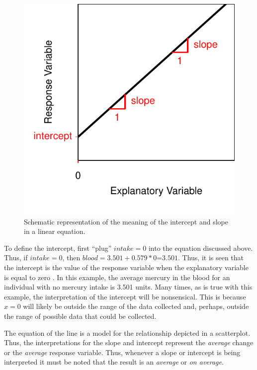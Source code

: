 \documentclass[10pt,openany]{book}\usepackage[]{graphicx}\usepackage[]{color}
\newenvironment{knitrout}{}{} %
\begin{document}
\begin{knitrout}
\color{fgcolor}\begin{figure}[hbtp]

{\centering \includegraphics[width=.4\linewidth]{Figs/SlopeInt-1} 

}

\caption[Schematic representation of the meaning of the intercept and slope in a linear equation]{Schematic representation of the meaning of the intercept and slope in a linear equation.}\label{fig:SlopeInt}
\end{figure}


\end{knitrout}

To define the intercept, first ``plug'' $intake=0$ into the equation discussed above.  Thus, if $intake=0$, then $blood=3.501+0.579*0$=$3.501$.  Thus, it is seen that the intercept is the value of the response variable when the explanatory variable is equal to zero .  In this example, the average mercury in the blood for an individual with no mercury intake is 3.501 units.  Many times, as is true with this example, the interpretation of the intercept will be nonsensical.  This is because $x=0$ will likely be outside the range of the data collected and, perhaps, outside the range of possible data that could be collected.

The equation of the line is a model for the relationship depicted in a scatterplot.  Thus, the interpretations for the slope and intercept represent the \textit{average} change or the \textit{average} response variable.  Thus, whenever a slope or intercept is being interpreted it must be noted that the result is an \textit{average} or \textit{on average}.


\vspace{-12pt}
\end{document}
